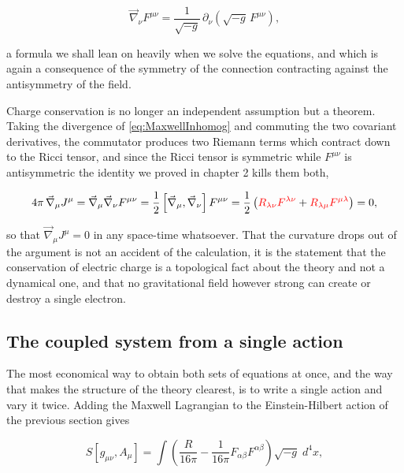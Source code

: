         \begin{equation}\label{eq:DivAntisym}
            \Vec{\nabla}_{\nu}F^{\mu\nu} = \frac{1}{\sqrt{-g}}\,\partial_{\nu}\left(\sqrt{-g}\,F^{\mu\nu}\right),
        \end{equation}

        a formula we shall lean on heavily when we solve the equations, and which is again a consequence of the symmetry of the connection contracting against the antisymmetry of the field.

        Charge conservation is no longer an independent assumption but a theorem. Taking the divergence of \ref{eq:MaxwellInhomog} and commuting the two covariant derivatives, the commutator produces two Riemann terms which contract down to the Ricci tensor, and since the Ricci tensor is symmetric while $F^{\mu\nu}$ is antisymmetric the identity we proved in chapter 2 kills them both,

        \begin{align*}
            4\pi\,\Vec{\nabla}_{\mu}J^{\mu} = \Vec{\nabla}_{\mu}\Vec{\nabla}_{\nu}F^{\mu\nu} = \frac{1}{2}\left[\Vec{\nabla}_{\mu},\Vec{\nabla}_{\nu}\right]F^{\mu\nu} = \frac{1}{2}\left({\color{red}R_{\lambda\nu}F^{\lambda\nu}} + {\color{red}R_{\lambda\mu}F^{\mu\lambda}}\right) = 0,
        \end{align*}

        so that $\Vec{\nabla}_{\mu}J^{\mu}=0$ in any space-time whatsoever. That the curvature drops out of the argument is not an accident of the calculation, it is the statement that the conservation of electric charge is a topological fact about the theory and not a dynamical one, and that no gravitational field however strong can create or destroy a single electron.

    \subsection{The coupled system from a single action}

        The most economical way to obtain both sets of equations at once, and the way that makes the structure of the theory clearest, is to write a single action and vary it twice. Adding the Maxwell Lagrangian to the Einstein-Hilbert action of the previous section gives

        \begin{equation}\label{eq:EMAction}
            S\left[g_{\mu\nu},A_{\mu}\right] = \int\left(\frac{R}{16\pi} - \frac{1}{16\pi}F_{\alpha\beta}F^{\alpha\beta}\right)\sqrt{-g}\;d^4x,
        \end{equation}


